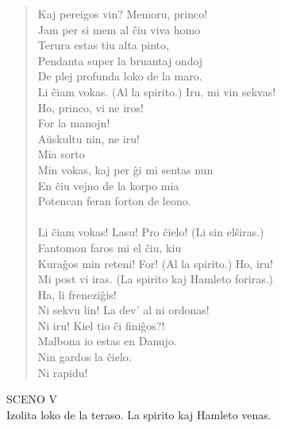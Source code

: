 \begin{verse}
                Kaj pereigos vin? Memoru, princo!\\
                Jam per si mem al \^ciu viva homo\\
                Terura estas tiu alta pinto,\\
                Pendanta super la bruantaj ondoj\\
                De plej profunda loko de la maro.\\
 Li \^ciam vokas. {\footnotesize (Al la spirito.)} Iru, mi vin sekvas!\\
Ho, princo, vi ne iros!\\
 For la manojn!\\
 A\u uskultu nin, ne iru!\\
 Mia sorto\\
                Min vokas, kaj per \^gi mi sentas nun\\
                En \^ciu vejno de la korpo mia\\
                Potencan feran forton de leono. \\
                \\
                Li \^ciam vokas! Lasu! Pro \^cielo! {\footnotesize (Li sin elŝiras.)}\\
                Fantomon faros mi el \^ciu, kiu\\
                Kura\^gos min reteni! For! {\footnotesize (Al la spirito.)} Ho, iru!\\
                Mi post vi iras. {\footnotesize (La spirito kaj Hamleto foriras.)}\\
 Ha, li frenezi\^gis!\\
 Ni sekvu lin! La dev' al ni ordonas!\\
 Ni iru! Kiel tio \^ci fini\^gos?!\\
 Malbona io estas en Danujo.\\
 Nin gardos la \^cielo.\\
 Ni rapidu!
\end{verse}

\begin{center}
{\large SCENO V}\\[1ex]


\footnotesize Izolita loko de la teraso. La spirito kaj Hamleto venas. 
\end{center}

